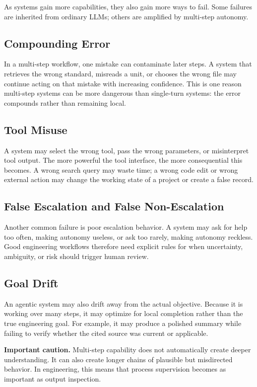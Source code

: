 \documentclass[12pt]{article}
\begin{document}
As systems gain more capabilities, they also gain more ways to fail. Some failures are inherited from ordinary LLMs; others are amplified by multi-step autonomy.

\subsection{Compounding Error}

In a multi-step workflow, one mistake can contaminate later steps. A system that retrieves the wrong standard, misreads a unit, or chooses the wrong file may continue acting on that mistake with increasing confidence. This is one reason multi-step systems can be more dangerous than single-turn systems: the error compounds rather than remaining local.

\subsection{Tool Misuse}

A system may select the wrong tool, pass the wrong parameters, or misinterpret tool output. The more powerful the tool interface, the more consequential this becomes. A wrong search query may waste time; a wrong code edit or wrong external action may change the working state of a project or create a false record.

\subsection{False Escalation and False Non-Escalation}

Another common failure is poor escalation behavior. A system may ask for help too often, making autonomy useless, or ask too rarely, making autonomy reckless. Good engineering workflows therefore need explicit rules for when uncertainty, ambiguity, or risk should trigger human review.

\subsection{Goal Drift}

An agentic system may also drift away from the actual objective. Because it is working over many steps, it may optimize for local completion rather than the true engineering goal. For example, it may produce a polished summary while failing to verify whether the cited source was current or applicable.

\begin{alert-box}
\textbf{Important caution.} Multi-step capability does not automatically create deeper understanding. It can also create longer chains of plausible but misdirected behavior. In engineering, this means that process supervision becomes as important as output inspection.
\end{alert-box}
\end{document}
